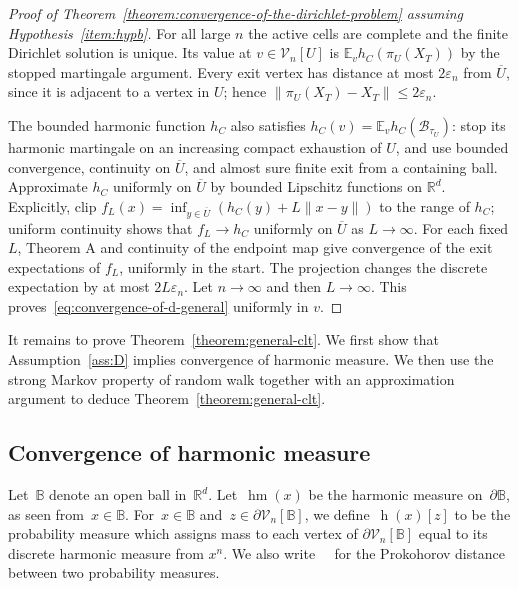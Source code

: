 \documentclass[12pt]{amsart}
\numberwithin{equation}{section}
\newcommand*{\Rd}{\ensuremath{\mathbb{R}^d}}
\newcommand{\V}{\mathcal{V}}
\newcommand{\eps}{\varepsilon}
\newcommand{\B}{\mathbb{B}}
\DeclareMathOperator{\hm}{\mathop{hm}}
\DeclareMathOperator{\hmn}{\mathop{hm^{n}}}
\DeclareMathOperator{\dPr}{\mathop{d^{Pr}}}
\begin{document}
\begin{proof}[Proof of Theorem~\ref{theorem:convergence-of-the-dirichlet-problem} assuming Hypothesis~\ref{item:hypb}]
For all large $n$ the active cells are complete and the finite Dirichlet solution is unique. Its value at $v\in\V_n[U]$ is
$\mathbb E_v h_C(\pi_U(X_T))$ by the stopped martingale argument. Every exit vertex has distance at most $2\eps_n$ from $\overline U$, since it is adjacent to a vertex in $U$; hence $\|\pi_U(X_T)-X_T\|\leq2\eps_n$.

The bounded harmonic function $h_C$ also satisfies
$h_C(v)=\mathbb E_v h_C(\mathcal B_{\tau_U})$: stop its harmonic martingale on an increasing compact exhaustion of $U$, and use bounded convergence, continuity on $\overline U$, and almost sure finite exit from a containing ball. Approximate $h_C$ uniformly on $\overline U$ by bounded Lipschitz functions on $\Rd$. Explicitly, clip
$f_L(x)=\inf_{y\in\overline U}(h_C(y)+L\|x-y\|)$
to the range of $h_C$; uniform continuity shows that $f_L\to h_C$ uniformly on $\overline U$ as $L\to\infty$. For each fixed $L$, Theorem A and continuity of the endpoint map give convergence of the exit expectations of $f_L$, uniformly in the start. The projection changes the discrete expectation by at most $2L\eps_n$. Let $n\to\infty$ and then $L\to\infty$. This proves~\eqref{eq:convergence-of-d-general} uniformly in $v$.
\end{proof}



It remains to prove Theorem~\ref{theorem:general-clt}. We first show that Assumption~\ref{ass:D} implies convergence of harmonic measure. We then use the strong Markov property  of random walk together with an approximation argument to deduce Theorem~\ref{theorem:general-clt}. 




\subsection{Convergence of harmonic measure}
Let~$\B$ denote an open ball in~$\Rd$.
Let~$\hm(x)$ be the harmonic measure on~$\partial \B$, as seen from~$x \in \B$. For~$x \in \B$ and~$z \in \partial \V_n[\B]$, we define~$\hmn(x)[z]$ to be the probability measure which assigns 
mass to each vertex of $\partial\V_n[\B]$ equal to its discrete harmonic measure from $x^n$. We also write~$\dPr$ for the Prokohorov distance between two probability measures. 
 
\end{document}
